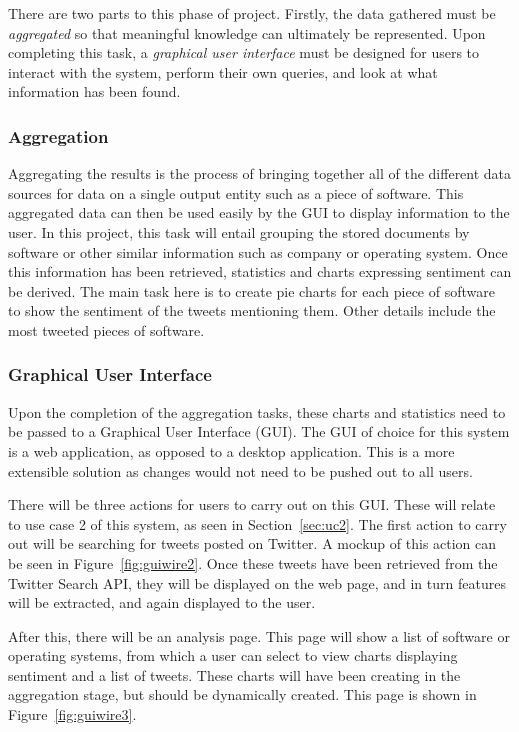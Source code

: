 There are two parts to this phase of project. Firstly, the data gathered must be \emph{aggregated} so that meaningful knowledge can ultimately be represented. Upon completing this task, a \emph{graphical user interface} must be designed for users to interact with the system, perform their own queries, and look at what information has been found.

\subsubsection{Aggregation}
Aggregating the results is the process of bringing together all of the different data sources for data on a single output entity such as a piece of software. This aggregated data can then be used easily by the GUI to display information to the user. In this project, this task will entail grouping the stored documents by software or other similar information such as company or operating system. Once this information has been retrieved, statistics and charts expressing sentiment can be derived. The main task here is to create pie charts for each piece of software to show the sentiment of the tweets mentioning them. Other details include the most tweeted pieces of software.

\subsubsection{Graphical User Interface}
\label{sec:guid}
Upon the completion of the aggregation tasks, these charts and statistics need to be passed to a Graphical User Interface (GUI). The GUI of choice for this system is a web application, as opposed to a desktop application. This is a more extensible solution as changes would not need to be pushed out to all users.

There will be three actions for users to carry out on this GUI. These will relate to use case 2 of this system, as seen in Section~\ref{sec:uc2}. The first action to carry out will be searching for tweets posted on Twitter. A mockup of this action can be seen in Figure~\ref{fig:guiwire2}. Once these tweets have been retrieved from the Twitter Search API, they will be displayed on the web page, and in turn features will be extracted, and again displayed to the user.

After this, there will be an analysis page. This page will show a list of software or operating systems, from which a user can select to view charts displaying sentiment and a list of tweets. These charts will have been creating in the aggregation stage, but should be dynamically created. This page is shown in Figure~\ref{fig:guiwire3}.

